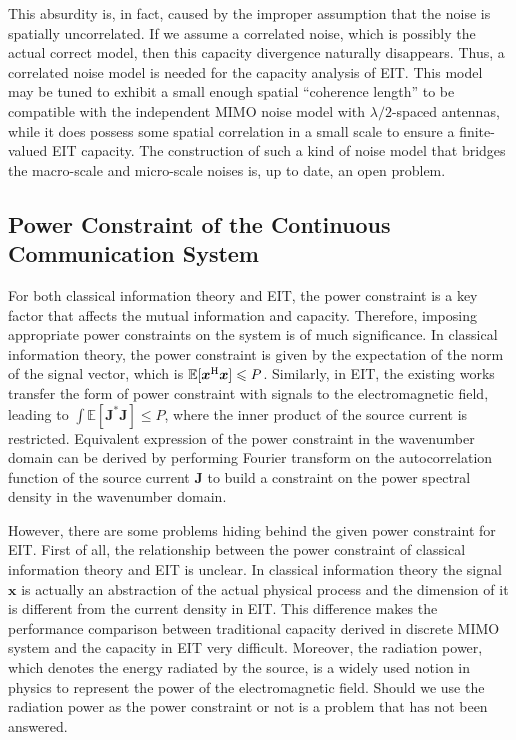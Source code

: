 \documentclass[journal,twocolumn]{IEEEtran}
\begin{document}
This absurdity is, in fact, caused by the improper assumption that the noise is spatially uncorrelated. If we assume a correlated noise, which is possibly the actual correct model, then this capacity divergence naturally disappears. 
Thus, a correlated noise model is needed for the capacity analysis of EIT. This model may be tuned to exhibit a small enough spatial ``coherence length'' to be compatible with the independent  MIMO noise model with $\lambda/2$-spaced antennas, while it does possess some spatial correlation in a small scale to ensure a finite-valued EIT capacity. 
The construction of such a kind of noise model that bridges the macro-scale and micro-scale noises is, up to date, an open problem. 

\subsection{Power Constraint of the Continuous Communication System}
For both classical information theory and EIT, the power constraint is a key factor that affects the mutual information and capacity. Therefore, imposing appropriate power constraints on the system is of much significance. In classical information theory, the power constraint is given by the expectation of the norm of the signal vector, which is $\mathbb{E}[ {\bm x}^{\rm H}{\bm x} ] \leqslant P$. Similarly, in EIT, the existing works transfer the form of power constraint with signals to the electromagnetic field, leading to $\int \mathbb{E}[ {\bm J}^*{\bm J} ] \leqslant P$, where the inner product of the source current is restricted. Equivalent expression of the power constraint in the wavenumber domain can be derived by performing Fourier transform on the autocorrelation function of the source current ${\bm J}$ to build a constraint on the power spectral density in the wavenumber domain. 

However, there are some problems hiding behind the given power constraint for EIT. First of all, the relationship between the power constraint of classical information theory and EIT is unclear. In classical information theory the signal ${\bm x}$ is actually an abstraction of the actual physical process and the dimension of it is different from the current density in EIT. This difference makes the performance comparison between traditional capacity derived in discrete MIMO system and the capacity in EIT very difficult. Moreover, the radiation power, which denotes the energy radiated by the source, is a widely used notion in physics to represent the power of the electromagnetic field. Should we use the radiation power as the power constraint or not is a problem that has not been answered.
\end{document}
